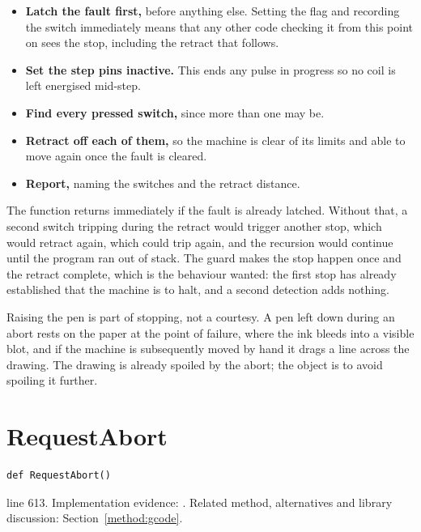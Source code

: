 \begin{itemize}\setlength\itemsep{0pt}
  \item \textbf{Latch the fault first,} before anything else. Setting the flag and recording the switch immediately means that any other code checking it from this point on sees the stop, including the retract that follows.
  \item \textbf{Set the step pins inactive.} This ends any pulse in progress so no coil is left energised mid-step.
  \item \textbf{Find every pressed switch,} since more than one may be.
  \item \textbf{Retract off each of them,} so the machine is clear of its limits and able to move again once the fault is cleared.
  \item \textbf{Report,} naming the switches and the retract distance.
\end{itemize}

The function returns immediately if the fault is already latched. Without that, a second switch tripping during the retract would trigger another stop, which would retract again, which could trip again, and the recursion would continue until the program ran out of stack. The guard makes the stop happen once and the retract complete, which is the behaviour wanted: the first stop has already established that the machine is to halt, and a second detection adds nothing.


Raising the pen is part of stopping, not a courtesy. A pen left down during an abort rests on the paper at the point of failure, where the ink bleeds into a visible blot, and if the machine is subsequently moved by hand it drags a line across the drawing. The drawing is already spoiled by the abort; the object is to avoid spoiling it further.



\section{RequestAbort}\label{fn:reproduce:RequestAbort}
\begin{lstlisting}[style=sig]
def RequestAbort()
\end{lstlisting}
 line 613. Implementation evidence: \cite{code2026}. Related method, alternatives and library discussion: Section~\ref{method:gcode}.


